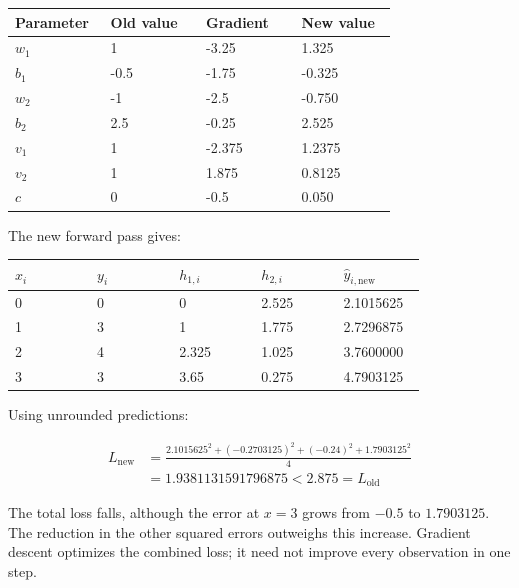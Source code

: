 \documentclass{course_sheet}
\begin{document}
\begin{center}

\begingroup
\setlength{\tabcolsep}{3pt}
\begin{tabular}{@{}p{0.234\linewidth}p{0.234\linewidth}p{0.234\linewidth}p{0.234\linewidth}@{}}
\toprule
Parameter & Old value & Gradient & New value \\
\midrule
$w_1$ & 1 & -3.25 & 1.325 \\
$b_1$ & -0.5 & -1.75 & -0.325 \\
$w_2$ & -1 & -2.5 & -0.750 \\
$b_2$ & 2.5 & -0.25 & 2.525 \\
$v_1$ & 1 & -2.375 & 1.2375 \\
$v_2$ & 1 & 1.875 & 0.8125 \\
$c$ & 0 & -0.5 & 0.050 \\
\bottomrule
\end{tabular}
\endgroup

\end{center}

The new forward pass gives:

\begin{center}

\begingroup
\setlength{\tabcolsep}{3pt}
\small
\begin{tabular}{@{}p{0.185\linewidth}p{0.185\linewidth}p{0.185\linewidth}p{0.185\linewidth}p{0.185\linewidth}@{}}
\toprule
$x_i$ & $y_i$ & $h_{1,i}$ & $h_{2,i}$ & $\hat y_{i,\mathrm{new}}$ \\
\midrule
0 & 0 & 0 & 2.525 & 2.1015625 \\
1 & 3 & 1 & 1.775 & 2.7296875 \\
2 & 4 & 2.325 & 1.025 & 3.7600000 \\
3 & 3 & 3.65 & 0.275 & 4.7903125 \\
\bottomrule
\end{tabular}
\endgroup

\end{center}

Using unrounded predictions:

\begin{equation*}
\begin{split}
L_{\mathrm{new}}&=\frac{2.1015625^2+(-0.2703125)^2+(-0.24)^2+1.7903125^2}{4}\\
&=1.9381131591796875<2.875=L_{\mathrm{old}}
\end{split}
\end{equation*}

The total loss falls, although the error at $x=3$ grows from $-0.5$ to
$1.7903125$. The reduction in the other squared errors outweighs this
increase. Gradient descent optimizes the combined loss; it need not
improve every observation in one step.
\end{document}
